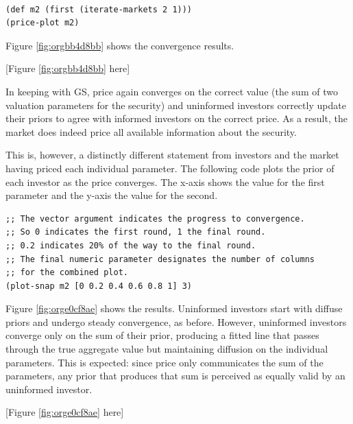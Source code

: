 \documentclass[11pt]{article}
\begin{document}
\singlespacing
\lstset{language=Lisp,label= ,caption= ,captionpos=b,numbers=none}
\begin{lstlisting}

(def m2 (first (iterate-markets 2 1)))
(price-plot m2)

\end{lstlisting}
\doublespacing

Figure \ref{fig:orgbb4d8bb} shows the convergence results. 

\begin{center}
[Figure \ref{fig:orgbb4d8bb} here]
\end{center}

In keeping with GS, price again converges on the correct value (the sum of two valuation parameters for the security) and uninformed investors correctly update their priors to agree with informed investors on the correct price. As a result, the market does indeed price all available information about the security.

This is, however, a distinctly different statement from investors and the market having priced each individual parameter. The following code plots the prior of each investor as the price converges. The x-axis shows the value for the first parameter and the y-axis the value for the second.

\singlespacing
\lstset{language=Lisp,label= ,caption= ,captionpos=b,numbers=none}
\begin{lstlisting}
;; The vector argument indicates the progress to convergence.
;; So 0 indicates the first round, 1 the final round.
;; 0.2 indicates 20% of the way to the final round.
;; The final numeric parameter designates the number of columns
;; for the combined plot.
(plot-snap m2 [0 0.2 0.4 0.6 0.8 1] 3)

\end{lstlisting}
\doublespacing

Figure \ref{fig:orge0cf8ae} shows the results. Uninformed investors start with diffuse priors and undergo steady convergence, as before. However, uninformed investors converge only on the sum of their prior, producing a fitted line that passes through the true aggregate value but maintaining diffusion on the individual parameters. This is expected: since price only communicates the sum of the parameters, any prior that produces that sum is perceived as equally valid by an uninformed investor.

\begin{center}
[Figure \ref{fig:orge0cf8ae} here]
\end{center}
\end{document}
